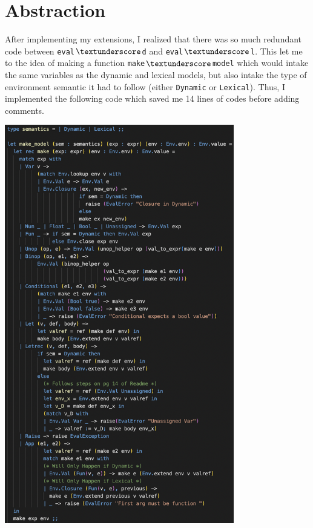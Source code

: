 \documentclass[12pt]{article}
\def\code#1{\texttt{#1}}
\begin{document}
\section{Abstraction}
After implementing my extensions, I realized that there was so much redundant code between \code{eval$\textunderscore$d} and \code{eval$\textunderscore$l}. This let me to the idea of making a function \code{make$\textunderscore$model} which would intake the same variables as the dynamic and lexical models, but also intake the type of environment semantic it had to follow (either \code{Dynamic} or \code{Lexical}). Thus, I implemented the following code which saved me 14 lines of codes before adding comments.
\begin{center}
    \includegraphics[width=10cm]{makemodel.png}
\end{center}
\end{document}
